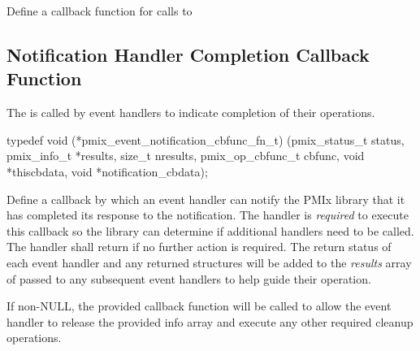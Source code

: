 \descr

Define a callback function for calls to 


\subsection{Notification Handler Completion Callback Function}

\summary

The  is called by event handlers to indicate completion of their operations.

\cspecificstart
\begin{codepar}
typedef void (*pmix_event_notification_cbfunc_fn_t)
    (pmix_status_t status,
     pmix_info_t *results, size_t nresults,
     pmix_op_cbfunc_t cbfunc, void *thiscbdata,
     void *notification_cbdata);
\end{codepar}
\cspecificend

\begin{arglist}
\end{arglist}

\descr

Define a callback by which an event handler can notify the \ac{PMIx} library that it has completed its response to the notification. The handler is \textit{required} to execute this callback so the library can determine if additional handlers need to be called. The handler shall return  if no further action is required. The return status of each event handler and any returned  structures will be added to the \textit{results} array of  passed to any subsequent event handlers to help guide their operation.

If non-NULL, the provided callback function will be called to allow the event handler to release the provided info array and execute any other required cleanup operations.


